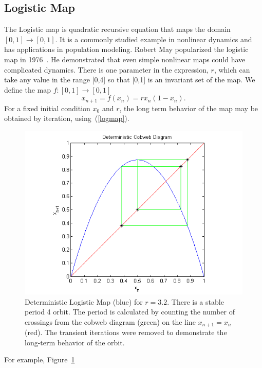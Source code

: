 \subsection{Logistic Map}
The Logistic map is  quadratic recursive equation that maps the domain
$[0,1] \rightarrow [0,1]$. It is a commonly studied example in nonlinear dynamics and has
applications in population modeling. Robert May popularized the
logistic map in 1976~\cite{may}. He demonstrated that even simple nonlinear
maps could have complicated dynamics. There is one parameter in the
expression, $r$, which can take any value in the range [0,4] so that
[0,1] is an invariant set of the map. We define the map $f:[0,1]\to [0,1]$
\begin{equation}\label{logmap}
x_{n+1} = f(x_n) = rx_n(1-x_n).
\end{equation}
For a fixed initial condition $x_0$ and $r$, the long term behavior of
the map may be obtained by iteration, using~(\ref{logmap}). 
\begin{figure}[!h]
\caption[Deterministic logistic map, stable orbit]{Deterministic
  Logistic Map (blue) for $r=3.2$. There is a stable period 4
  orbit. The period is calculated by counting the number of crossings
  from the cobweb diagram (green) on the line $x_{n+1}=x_n$ (red). The
  transient iterations were removed to demonstrate the long-term
  behavior of the orbit.}\label{fig:detlogstable}
    \begin{center}
	\includegraphics[scale=0.75]{figs/det_cobweb.png}
    \end{center}
\end{figure}
For example, Figure~\ref{fig:detlogstable}
